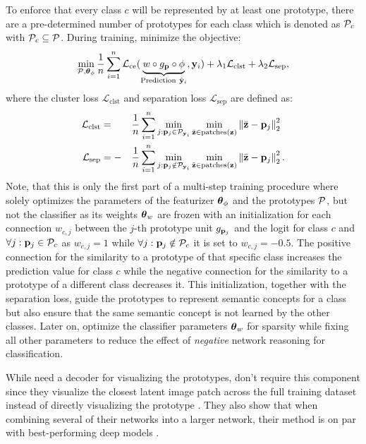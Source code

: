 To enforce that every class $c$ will be represented by at least one prototype, there are a pre-determined number of prototypes for each class which is denoted as $\mathcal{P}_c$ with $\mathcal{P}_c \subseteq \mathcal{P}$. During training, \citet{ChenLTBRS19} minimize the objective:
\begin{equation}
\label{eq:min_prototypes}
    \min_{\mathcal{P}, \boldsymbol{\theta}_\phi} \frac{1}{n} \sum_{i=1}^n \mathcal{L}_{\mathrm{ce}}(\underbrace{w \circ g_{\mathbf{p}} \circ \phi}_{\text{Prediction}\ \hat{\mathbf{y}}_{i}}, \mathbf{y}_i) + \lambda_1 \mathcal{L}_{\mathrm{clst}} + \lambda_2 \mathcal{L}_{\mathrm{sep}},
\end{equation}
where the cluster loss $\mathcal{L}_{\mathrm{clst}}$ and separation loss $\mathcal{L}_{\mathrm{sep}}$ are defined as:
\begin{alignat}{3}
\label{eq:prototype_losses}
    \mathcal{L}_{\mathrm{clst}} &= &&\frac{1}{n} \sum_{i=1}^n \min_{j: \mathbf{p}_{j} \in \mathcal{P}_{\mathbf{y}_i}} \min_{\Bar{\mathbf{z}} \in \text{patches}(\mathbf{z})} \left\|\Bar{\mathbf{z}} - \mathbf{p}_{j}\right\|^2_2\\
    \mathcal{L}_{\mathrm{sep}} &= -&&\frac{1}{n} \sum_{i=1}^n \min_{j: \mathbf{p}_{j} \notin \mathcal{P}_{\mathbf{y}_i}} \min_{\Bar{\mathbf{z}} \in \text{patches}(\mathbf{z})} \left\|\Bar{\mathbf{z}} - \mathbf{p}_{j}\right\|^2_2.
\end{alignat}
Note, that this is only the first part of a multi-step training procedure where  solely optimizes the parameters of the featurizer $\boldsymbol{\theta}_\phi$ and the prototypes $\mathcal{P}$, but not the classifier as its weights $\boldsymbol{\theta}_w$ are frozen with an initialization for each connection $w_{c,j}$ between the $j$-th prototype unit $g_{\mathbf{p}_{j}}$ and the logit for class $c$ and $\forall j: \mathbf{p}_{j} \in \mathcal{P}_c$ as $w_{c,j} = 1$ while $\forall j: \mathbf{p}_{j} \notin \mathcal{P}_c$ it is set to $w_{c,j} = -0.5$. The positive connection for the similarity to a prototype of that specific class increases the prediction value for class $c$ while the negative connection for the similarity to a prototype of a different class decreases it. This initialization, together with the separation loss, guide the prototypes to represent semantic concepts for a class but also ensure that the same semantic concept is not learned by the other classes. Later on, \citet{ChenLTBRS19} optimize the classifier parameters $\boldsymbol{\theta}_w$  for sparsity while fixing all other parameters to reduce the effect of \emph{negative} network reasoning for classification. 

While \citet{LiLCR18} need a decoder for visualizing the prototypes, \citet{ChenLTBRS19} don't require this component since they visualize the closest latent image patch across the full training dataset instead of directly visualizing the prototype \citep{ChenLTBRS19}. They also show that when combining several of their networks into a larger network, their method is on par with best-performing deep models \citep{ChenLTBRS19}.



